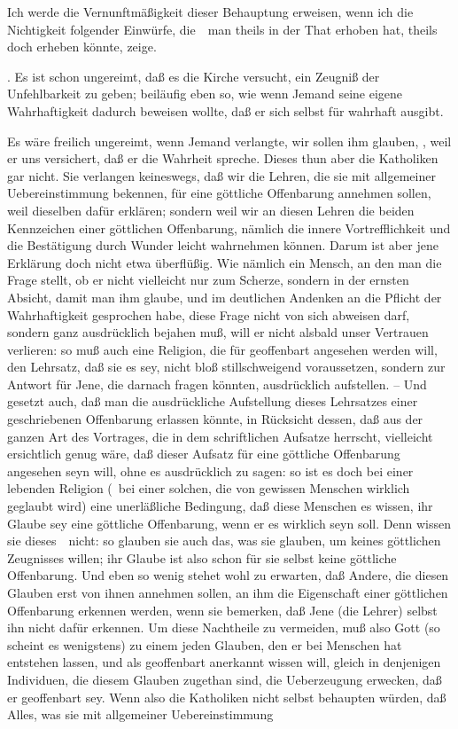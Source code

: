 Ich werde die Vernunftmäßigkeit dieser Behauptung erweisen, wenn ich die Nichtigkeit folgender Einwürfe, die~\ man theils in der That erhoben hat, theils doch erheben könnte, zeige.\par
{}. Es ist schon ungereimt, daß es die Kirche versucht, ein Zeugniß der Unfehlbarkeit  zu geben; beiläufig eben so, wie wenn Jemand seine eigene Wahrhaftigkeit dadurch beweisen wollte, daß er sich selbst für wahrhaft ausgibt.\par
{} Es wäre freilich ungereimt, wenn Jemand verlangte, wir sollen ihm glauben, , weil er uns versichert, daß er die Wahrheit spreche. Dieses thun aber die Katholiken gar nicht. Sie verlangen keineswegs, daß wir die Lehren, die sie mit allgemeiner Uebereinstimmung bekennen, für eine göttliche Offenbarung annehmen sollen, weil  dieselben dafür erklären; sondern weil wir an diesen Lehren die beiden Kennzeichen einer göttlichen Offenbarung, nämlich die innere Vortrefflichkeit und die Bestätigung durch Wunder leicht wahrnehmen können. Darum ist aber jene Erklärung doch nicht etwa überflüßig. Wie nämlich ein Mensch, an den man die Frage stellt, ob er nicht vielleicht nur zum Scherze, sondern in der ernsten Absicht, damit man ihm glaube, und im deutlichen Andenken an die Pflicht der Wahrhaftigkeit gesprochen habe, diese Frage nicht von sich abweisen darf, sondern ganz ausdrücklich bejahen muß, will er nicht alsbald unser Vertrauen verlieren: so muß auch eine Religion, die für geoffenbart angesehen werden will, den Lehrsatz, daß sie es sey, nicht bloß stillschweigend voraussetzen, sondern zur Antwort für Jene, die darnach fragen könnten, ausdrücklich aufstellen. -- Und gesetzt auch, daß man die ausdrückliche Aufstellung dieses Lehrsatzes einer geschriebenen Offenbarung erlassen könnte, in Rücksicht dessen, daß aus der ganzen Art des Vortrages, die in dem schriftlichen Aufsatze herrscht, vielleicht ersichtlich genug wäre, daß dieser Aufsatz für eine göttliche Offenbarung angesehen seyn will, ohne es ausdrücklich zu sagen: so ist es doch bei einer lebenden Religion (\dh\ bei einer solchen, die von gewissen Menschen wirklich geglaubt wird) eine unerläßliche Bedingung, daß diese Menschen es wissen, ihr Glaube sey eine göttliche Offenbarung, wenn er es wirklich seyn soll. Denn wissen sie dieses~\ nicht: so glauben sie auch das, was sie glauben, um keines göttlichen Zeugnisses willen; ihr Glaube ist also schon für sie selbst keine göttliche Offenbarung. Und eben so wenig stehet wohl zu erwarten, daß Andere, die diesen Glauben erst von ihnen annehmen sollen, an ihm die Eigenschaft einer göttlichen Offenbarung erkennen werden, wenn sie bemerken, daß Jene (die Lehrer) selbst ihn nicht dafür erkennen. Um diese Nachtheile zu vermeiden, muß also Gott (so scheint es wenigstens) zu einem jeden Glauben, den er bei Menschen hat entstehen lassen, und als geoffenbart anerkannt wissen will, gleich in denjenigen Individuen, die diesem Glauben zugethan sind, die Ueberzeugung erwecken, daß er geoffenbart sey. Wenn also die Katholiken nicht selbst behaupten würden, daß Alles, was sie mit allgemeiner Uebereinstimmung 